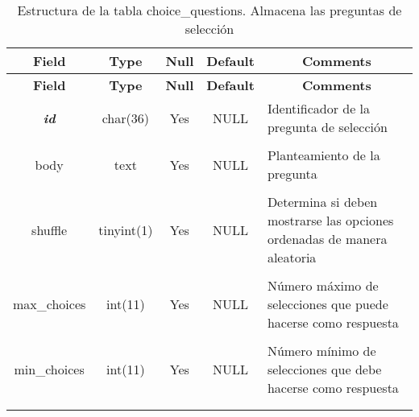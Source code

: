 %
%
\begin{longtable}{c c c c l}
	\multicolumn{1}{c}{\textbf{Field}} &
	\multicolumn{1}{c}{\textbf{Type}} &
	\multicolumn{1}{c}{\textbf{Null}} &
	\multicolumn{1}{c}{\textbf{Default}} &
	\multicolumn{1}{c}{\textbf{Comments}} \\ \hline \hline
\endfirsthead
	\multicolumn{1}{c}{\textbf{Field}} &
	\multicolumn{1}{c}{\textbf{Type}} &
	\multicolumn{1}{c}{\textbf{Null}} &
	\multicolumn{1}{c}{\textbf{Default}} &
	\multicolumn{1}{c}{\textbf{Comments}} \\ \hline \hline
\endhead \endfoot
	\textbf{\textit{id}} & char(36) & Yes & NULL & \parbox[t]{0.35\textwidth}{Identificador de la pregunta de selección} \\ \\  \hline
	body & text & Yes & NULL & \parbox[t]{0.35\textwidth}{Planteamiento de la pregunta} \\ \\  \hline
	shuffle & tinyint(1) & Yes & NULL & \parbox[t]{0.35\textwidth}{Determina si deben mostrarse las opciones ordenadas de manera aleatoria} \\ \\  \hline
	max\_choices & int(11) & Yes & NULL & \parbox[t]{0.35\textwidth}{Número máximo de selecciones que puede hacerse como respuesta} \\ \\  \hline
	min\_choices & int(11) & Yes & NULL & \parbox[t]{0.35\textwidth}{Número mínimo de selecciones que debe hacerse como respuesta} \\ \\ 
\caption[Estructura de la tabla choice\_questions]{Estructura de la tabla choice\_questions. Almacena las preguntas de selección} \label{tab:quiz_choice_questions-structure} \\
\end{longtable}

